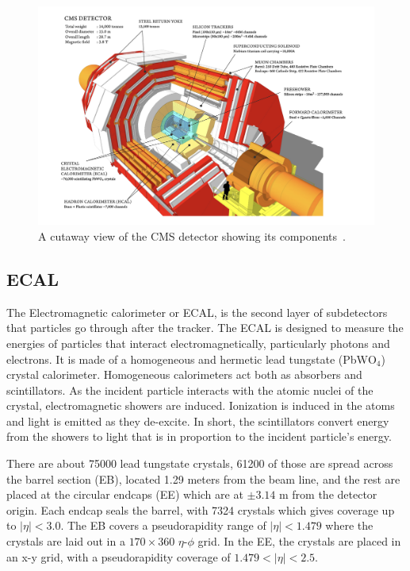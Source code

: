 \begin{figure}[tbp!]
\begin{center}
\includegraphics[scale=0.5]{fig/CutawayViewCMSDetector.png}
\end{center}
\caption{A cutaway view of the CMS detector showing its components~\cite{Sakuma:2013jqa}.
}
\label{fig:CMSdetectorCutaway}
\end{figure}

\subsection{ECAL}

The Electromagnetic calorimeter or ECAL, is the second layer of subdetectors that particles go through after the tracker. The ECAL is designed to measure the energies of particles that interact electromagnetically, particularly photons and electrons. It is made of a homogeneous and hermetic lead tungstate (PbW$\text{O}_4$) crystal calorimeter. Homogeneous calorimeters act both as absorbers and scintillators.
As the incident particle interacts with the atomic nuclei of the crystal, electromagnetic showers are induced. Ionization is induced in the atoms and light is emitted as they de-excite. In short, the scintillators convert energy from the showers to light that is in proportion to the incident particle's energy.

There are about 75000 lead tungstate crystals, 61200 of those are spread across the barrel section (EB), located 1.29 meters from the beam line, and the rest are placed at the circular endcaps (EE) which are at $\pm 3.14$ m from the detector origin. Each endcap seals the barrel, with 7324 crystals which gives coverage up to $|\eta| < 3.0$. The EB covers a pseudorapidity range of $|\eta| < 1.479$ where the crystals are laid out in a $170\times360$ $\eta$-$\phi$ grid. In the EE, the crystals are placed in an x-y grid, with a pseudorapidity coverage of $1.479 <|\eta| < 2.5$. 

